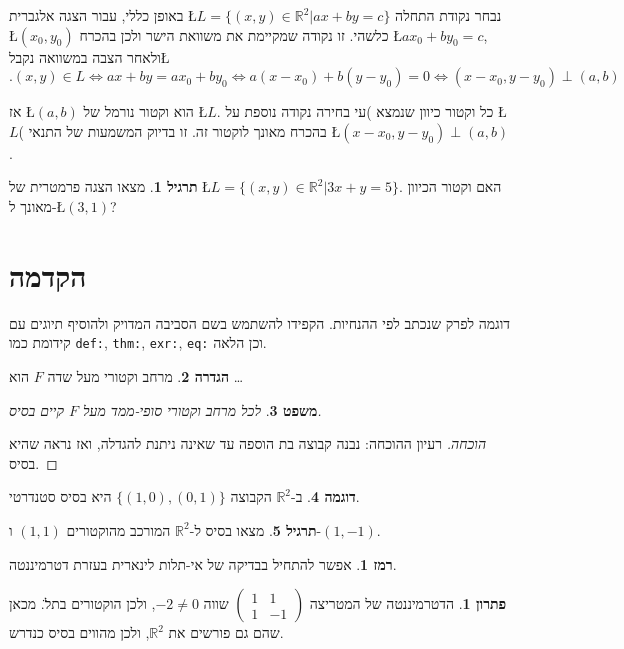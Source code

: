 \documentclass[12pt]{book}
\theoremstyle{plain}
\newtheorem{theorem}{משפט}[chapter]
\theoremstyle{definition}
\newtheorem{definition}[theorem]{הגדרה}
\newtheorem{example}[theorem]{דוגמה}
\newtheorem{exercise}[theorem]{תרגיל}
\newtheorem*{solution}{פתרון}
\newtheorem*{hint}{רמז}
\newcommand{\R}{\mathbb{R}}
\begin{document}
באופן כללי, עבור הצגה אלגברית \L{$L=\{(x,y)\in\mathbb{R}^{2}|ax+by=c\}$}
נבחר נקודת התחלה \L{$(x_{0},y_{0})$} כלשהי. זו נקודה שמקיימת את משוואת
הישר ולכן בהכרח \L{$ax_{0}+by_{0}=c$}, ולאחר הצבה במשוואה נקבל\L{%
	\[
	.(x,y)\in L\iff ax+by=ax_{0}+by_{0}\iff a(x-x_{0})+b(y-y_{0})=0\iff(x-x_{0},y-y_{0})\perp(a,b)
	\]
}%

אז \L{$(a,b)$} הוא וקטור נורמל של \L{$L$}. כל וקטור כיוון שנמצא
)ע\textquotedbl י בחירה נקודה נוספת על \L{$L$}( בהכרח מאונך לוקטור
זה. זו בדיוק המשמעות של התנאי \L{$(x-x_{0},y-y_{0})\perp(a,b)$}.

\begin{exercise}
מצאו הצגה פרמטרית של \L{$L=\{(x,y)\in\mathbb{R}^{2}|3x+y=5\}$}.
האם וקטור הכיוון מאונך ל-\L{$(3,1)$}?
\end{exercise}


\section{הקדמה}
דוגמה לפרק שנכתב לפי ההנחיות. הקפידו להשתמש בשם הסביבה המדויק ולהוסיף תיוגים עם קידומת
כמו \verb|def:|, \verb|thm:|, \verb|exr:|, \verb|eq:| וכן הלאה.

\begin{definition}\label{def:vectorspace}
מרחב וקטורי מעל שדה \(F\) הוא \dots
\end{definition}

\begin{theorem}\label{thm:basis-exists}
לכל מרחב וקטורי סופי-ממד מעל \(F\) קיים בסיס.
\end{theorem}
\begin{proof}[הוכחה]
רעיון ההוכחה: נבנה קבוצה בת הוספה עד שאינה ניתנת להגדלה, ואז נראה שהיא בסיס. \qedhere
\end{proof}

\begin{example}\label{ex:first}
ב-\(\R^2\) הקבוצה \(\{(1,0),(0,1)\}\) היא בסיס סטנדרטי.
\end{example}

\begin{exercise}\label{exr:find-basis}
מצאו בסיס ל-\(\R^2\) המורכב מהוקטורים \((1,1)\) ו-\((1,-1)\).
\end{exercise}

\begin{hint}
אפשר להתחיל בבדיקה של אי-תלות לינארית בעזרת דטרמיננטה.
\end{hint}

\begin{solution}
הדטרמיננטה של המטריצה \(\begin{pmatrix}1&1\\ 1&-1\end{pmatrix}\) שווה \(-2\neq 0\), ולכן הוקטורים בת\"ל.
מכאן שהם גם פורשים את \(\R^2\), ולכן מהווים בסיס כנדרש.
\end{solution}
\end{document}
